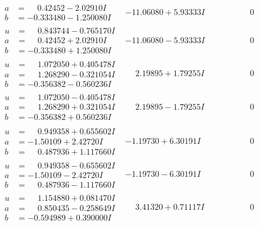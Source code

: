 \documentclass[1p]{elsarticle_modified}
\theoremstyle{definition}
\begin{document}
$$\begin{array}{c|c|c}
\begin{aligned}
a &= \phantom{-}0.42452 - 2.02910 I \\
b &= -0.333480 - 1.250080 I\end{aligned}
 & -11.06080 + 5.93333 I & \phantom{-0.000000 } 0 \\ \hline\begin{aligned}
u &= \phantom{-}0.843744 - 0.765170 I \\
a &= \phantom{-}0.42452 + 2.02910 I \\
b &= -0.333480 + 1.250080 I\end{aligned}
 & -11.06080 - 5.93333 I & \phantom{-0.000000 } 0 \\ \hline\begin{aligned}
u &= \phantom{-}1.072050 + 0.405478 I \\
a &= \phantom{-}1.268290 - 0.321054 I \\
b &= -0.356382 - 0.560236 I\end{aligned}
 & \phantom{-}2.19895 + 1.79255 I & \phantom{-0.000000 } 0 \\ \hline\begin{aligned}
u &= \phantom{-}1.072050 - 0.405478 I \\
a &= \phantom{-}1.268290 + 0.321054 I \\
b &= -0.356382 + 0.560236 I\end{aligned}
 & \phantom{-}2.19895 - 1.79255 I & \phantom{-0.000000 } 0 \\ \hline\begin{aligned}
u &= \phantom{-}0.949358 + 0.655602 I \\
a &= -1.50109 + 2.42720 I \\
b &= \phantom{-}0.487936 + 1.117660 I\end{aligned}
 & -1.19730 + 6.30191 I & \phantom{-0.000000 } 0 \\ \hline\begin{aligned}
u &= \phantom{-}0.949358 - 0.655602 I \\
a &= -1.50109 - 2.42720 I \\
b &= \phantom{-}0.487936 - 1.117660 I\end{aligned}
 & -1.19730 - 6.30191 I & \phantom{-0.000000 } 0 \\ \hline\begin{aligned}
u &= \phantom{-}1.154880 + 0.081470 I \\
a &= \phantom{-}0.850435 - 0.258649 I \\
b &= -0.594989 + 0.390000 I\end{aligned}
 & \phantom{-}3.41320 + 0.71117 I & \phantom{-0.000000 } 0 \\ \hline\begin{aligned}

\end{aligned}
\end{array}$$
\end{document}
